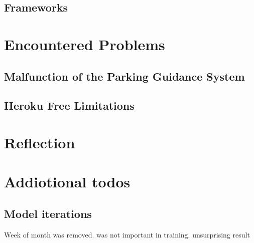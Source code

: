 \subsection{Frameworks}\label{sec:frameworks}


\section{Encountered Problems}\label{sec:challenges}
\subsection{Malfunction of the Parking Guidance System}


\subsection{Heroku Free Limitations}




\section{Reflection}


\section{Addiotional todos}
\subsection{Model iterations}

Week of month was removed. was not important in training. unsurprising result
